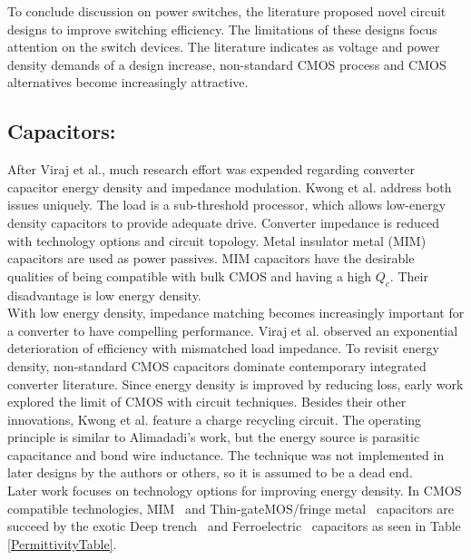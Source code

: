 \documentclass[letterpaper,twocolumn,10pt]{article}
\begin{document}
\indent To conclude discussion on power switches, the literature proposed novel circuit designs to improve switching efficiency. The limitations of these designs focus attention on the switch devices. The literature indicates as voltage and power density demands of a design increase, non-standard CMOS process and CMOS alternatives become increasingly attractive.\\
\subsection{Capacitors: }After Viraj et al.\cite{Viraj2007}, much research effort was expended regarding converter capacitor energy density and impedance modulation. Kwong et al.\cite{Kwong2009} address both issues uniquely. The load is a sub-threshold processor, which allows low-energy density capacitors to provide adequate drive. Converter impedance is reduced with technology options and circuit topology. Metal insulator metal (MIM) capacitors are used as power passives. MIM capacitors have the desirable qualities of being compatible with bulk CMOS and having a high $Q_c$. Their disadvantage is low energy density.\\
With low energy density, impedance matching becomes increasingly important for a converter to have compelling performance. Viraj et al.\cite{Viraj2007} observed an exponential deterioration of efficiency with mismatched load impedance. %
\indent To revisit energy density, non-standard CMOS capacitors dominate contemporary integrated converter literature. Since energy density is improved by reducing loss, early work explored the limit of CMOS with circuit techniques. Besides their other innovations, Kwong et al.\cite{Kwong2009} feature a charge recycling circuit. The operating principle is similar to Alimadadi's work\cite{Alimadadi2008}, but the energy source is parasitic capacitance and bond wire inductance. The technique was not implemented in later designs by the authors or others, so it is assumed to be a dead end.\\
\indent Later work focuses on technology options for improving energy density. In CMOS compatible technologies, MIM~\cite{Kwong2009} and Thin-gateMOS/fringe metal~\cite{Pique2012} capacitors are succeed by the exotic Deep trench~\cite{Andersen2013} and Ferroelectric~\cite{Damak2013} capacitors as seen in Table \ref{PermittivityTable}.\\
\end{document}
